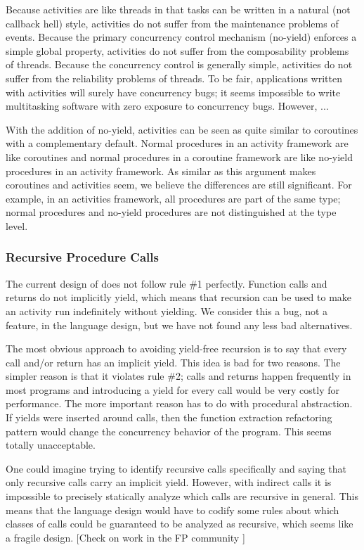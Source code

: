 \documentclass[10pt,preprint]{sigplanconf}
\begin{document}
Because activities are like threads in that tasks can be written in a natural (not callback hell) style, activities do not suffer from the maintenance problems of events.
Because the primary concurrency control mechanism (no-yield) enforces a simple global property, activities do not suffer from the composability problems of threads.
Because the concurrency control is generally simple, activities do not suffer from the reliability problems of threads.
To be fair, applications written with activities will surely have concurrency bugs; it seems impossible to write multitasking software with zero exposure to concurrency bugs.
However, ...

With the addition of no-yield, activities can be seen as quite similar to coroutines with a complementary default.
Normal procedures in an activity framework are like coroutines and normal procedures in a coroutine framework are like no-yield procedures in an activity framework.
As similar as this argument makes coroutines and activities seem, we believe the differences are still significant.
For example, in an activities framework, all procedures are part of the same type; normal procedures and no-yield procedures are not distinguished at the type level.

\subsubsection{Recursive Procedure Calls}

The current design of \charcoal{} does not follow rule \#1 perfectly.
Function calls and returns do not implicitly yield, which means that recursion can be used to make an activity run indefinitely without yielding.
We consider this a bug, not a feature, in the language design, but we have not found any less bad alternatives.

The most obvious approach to avoiding yield-free recursion is to say that every call and/or return has an implicit yield.
This idea is bad for two reasons.
The simpler reason is that it violates rule \#2; calls and returns happen frequently in most programs and introducing a yield for every call would be very costly for performance.
The more important reason has to do with procedural abstraction.
If yields were inserted around calls, then the function extraction refactoring pattern would change the concurrency behavior of the program.
This seems totally unacceptable.

One could imagine trying to identify recursive calls specifically and saying that only recursive calls carry an implicit yield.
However, with indirect calls it is impossible to precisely statically analyze which calls are recursive in general.
This means that the language design would have to codify some rules about which classes of calls could be guaranteed to be analyzed as recursive, which seems like a fragile design.
[Check on work in the FP community ]
\end{document}
